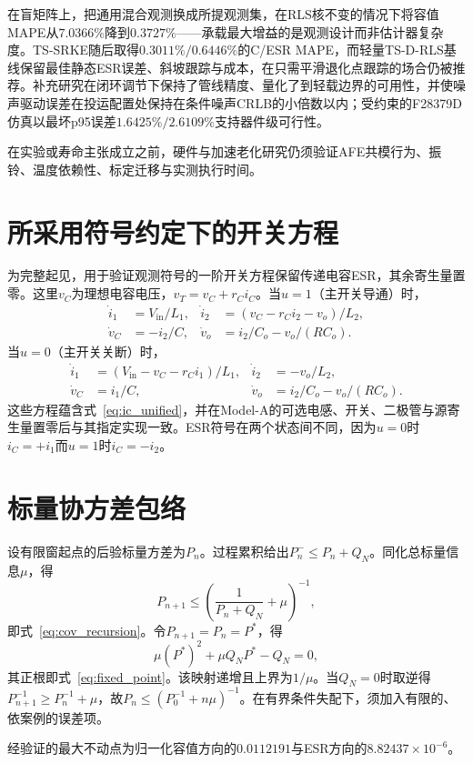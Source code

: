 \documentclass[zihao=5,a4paper]{ctexart}
\newcommand{\TSRLS}{TS-D-RLS}
\newcommand{\TSSRKE}{TS-SRKE}
\begin{document}
在盲矩阵上，把通用混合观测换成所提观测集，在RLS核不变的情况下将容值MAPE从$7.0366\%$降到$0.3727\%$——承载最大增益的是观测设计而非估计器复杂度。\TSSRKE{}随后取得$0.3011\%/0.6446\%$的C/ESR MAPE，而轻量\TSRLS{}基线保留最佳静态ESR误差、斜坡跟踪与成本，在只需平滑退化点跟踪的场合仍被推荐。补充研究在闭环调节下保持了管线精度、量化了到轻载边界的可用性，并使噪声驱动误差在投运配置处保持在条件噪声CRLB的小倍数以内；受约束的F28379D仿真以最坏p95误差$1.6425\%/2.6109\%$支持器件级可行性。

在实验或寿命主张成立之前，硬件与加速老化研究仍须验证AFE共模行为、振铃、温度依赖性、标定迁移与实测执行时间。

\appendix

\section{所采用符号约定下的开关方程}
\label{app:equations}

为完整起见，用于验证观测符号的一阶开关方程保留传递电容ESR，其余寄生量置零。这里$v_C$为理想电容电压，$v_T=v_C+r_Ci_C$。当$u=1$（主开关导通）时，
\begin{align}
\dot i_1&=V_{\mathrm{in}}/L_1, &
\dot i_2&=(v_C-r_Ci_2-v_o)/L_2,\\
\dot v_C&=-i_2/C, &
\dot v_o&=i_2/C_o-v_o/(RC_o).
\end{align}
当$u=0$（主开关关断）时，
\begin{align}
\dot i_1&=(V_{\mathrm{in}}-v_C-r_Ci_1)/L_1, &
\dot i_2&=-v_o/L_2,\\
\dot v_C&=i_1/C, &
\dot v_o&=i_2/C_o-v_o/(RC_o).
\end{align}
这些方程蕴含式~\eqref{eq:ic_unified}，并在Model-A的可选电感、开关、二极管与源寄生量置零后与其指定实现一致。ESR符号在两个状态间不同，因为$u=0$时$i_C=+i_1$而$u=1$时$i_C=-i_2$。

\section{标量协方差包络}
\label{app:covariance}

设有限窗起点的后验标量方差为$P_n$。过程累积给出$P_n^-\le P_n+Q_N$。同化总标量信息$\mu$，得
\begin{equation}
P_{n+1}\le\left(\frac{1}{P_n+Q_N}+\mu\right)^{-1},
\end{equation}
即式~\eqref{eq:cov_recursion}。令$P_{n+1}=P_n=P^*$，得
\begin{equation}
\mu(P^*)^2+\mu Q_NP^*-Q_N=0,
\end{equation}
其正根即式~\eqref{eq:fixed_point}。该映射递增且上界为$1/\mu$。当$Q_N=0$时取逆得$P_{n+1}^{-1}\ge P_n^{-1}+\mu$，故$P_n\le(P_0^{-1}+n\mu)^{-1}$。在有界条件失配下，须加入有限的、依案例的误差项。

经验证的最大不动点为归一化容值方向的$0.0112191$与ESR方向的$8.82437\times10^{-6}$。



\end{document}
